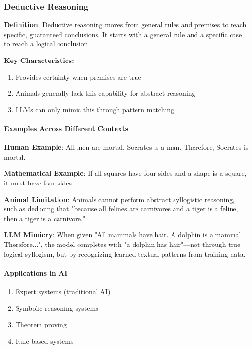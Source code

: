 \subsubsection{Deductive Reasoning}
\label{subsubsec:deductive-reasoning}

\textbf{Definition:} Deductive reasoning moves from general rules and premises to reach specific, guaranteed conclusions. It starts with a general rule and a specific case to reach a logical conclusion.

\textbf{Key Characteristics:}

\begin{enumerate}
\item Provides certainty when premises are true
\item Animals generally lack this capability for abstract reasoning
\item LLMs can only mimic this through pattern matching
\end{enumerate}

\paragraph{Examples Across Different Contexts}
\label{para:deductive-examples}

\textbf{Human Example}: All men are mortal. Socrates is a man. Therefore, Socrates is mortal.

\textbf{Mathematical Example}: If all squares have four sides and a shape is a square, it must have four sides.

\textbf{Animal Limitation}: Animals cannot perform abstract syllogistic reasoning, such as deducing that "because all felines are carnivores and a tiger is a feline, then a tiger is a carnivore."

\textbf{LLM Mimicry}: When given "All mammals have hair. A dolphin is a mammal. Therefore...", the model completes with "a dolphin has hair"—not through true logical syllogism, but by recognizing learned textual patterns from training data.

\paragraph{Applications in AI}
\label{para:deductive-applications}

\begin{enumerate}
\item Expert systems (traditional AI)
\item Symbolic reasoning systems
\item Theorem proving
\item Rule-based systems
\end{enumerate}

